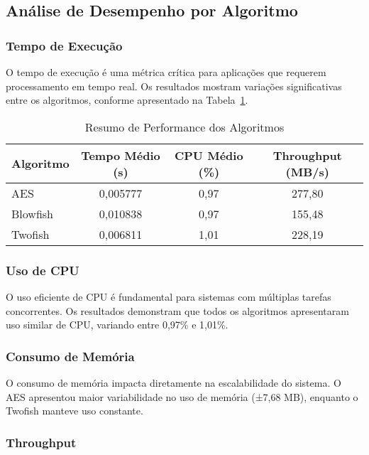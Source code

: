 \documentclass[12pt,a4paper,oneside]{article}
\begin{document}
\subsection{Análise de Desempenho por Algoritmo}

\subsubsection{Tempo de Execução}

O tempo de execução é uma métrica crítica para aplicações que requerem processamento em tempo real. Os resultados mostram variações significativas entre os algoritmos, conforme apresentado na Tabela~\ref{tab:performance}.

\begin{table}[H]
\centering
\caption{Resumo de Performance dos Algoritmos}
\label{tab:performance}
\begin{tabular}{lccc}
\toprule
\textbf{Algoritmo} & \textbf{Tempo Médio (s)} & \textbf{CPU Médio (\%)} & \textbf{Throughput (MB/s)} \\
\midrule
AES & 0,005777 & 0,97 & 277,80 \\
Blowfish & 0,010838 & 0,97 & 155,48 \\
Twofish & 0,006811 & 1,01 & 228,19 \\
\bottomrule
\end{tabular}
\end{table}

\subsubsection{Uso de CPU}

O uso eficiente de CPU é fundamental para sistemas com múltiplas tarefas concorrentes. Os resultados demonstram que todos os algoritmos apresentaram uso similar de CPU, variando entre 0,97\% e 1,01\%.

\subsubsection{Consumo de Memória}

O consumo de memória impacta diretamente na escalabilidade do sistema. O AES apresentou maior variabilidade no uso de memória (±7,68 MB), enquanto o Twofish manteve uso constante.

\subsubsection{Throughput}
\end{document}
